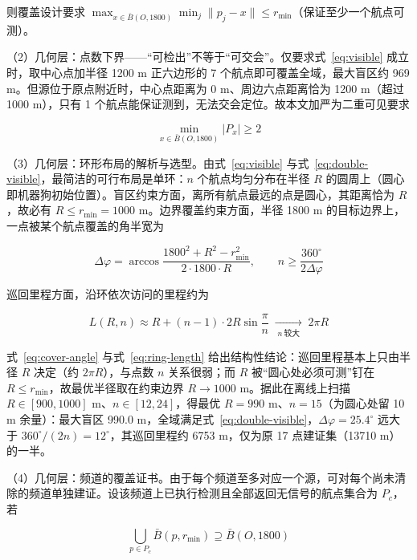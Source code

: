 \documentclass[12pt,a4paper]{ctexart}
\begin{document}
则覆盖设计要求 $\max_{x\in\bar B(O,1800)}\min_j\|p_j-x\|\le r_{\min}$（保证至少一个航点可测）。

（2）几何层：点数下界——“可检出”不等于“可交会”。仅要求式~\eqref{eq:visible} 成立时，取中心点加半径 1200 m 正六边形的 7 个航点即可覆盖全域，最大盲区约 969 m。但源位于原点附近时，中心点距离为 0 m、周边六点距离恰为 1200 m（超过 1000 m），只有 1 个航点能保证测到，无法交会定位。故本文加严为二重可见要求

\begin{equation}
	\min_{x\in\bar B(O,1800)}|P_x|\ge2
	\label{eq:double-visible}
\end{equation}

（3）几何层：环形布局的解析与选型。由式~\eqref{eq:visible} 与式~\eqref{eq:double-visible}，最简洁的可行布局是单环：$n$ 个航点均匀分布在半径 $R$ 的圆周上（圆心即机器狗初始位置）。盲区约束方面，离所有航点最远的点是圆心，其距离恰为 $R$，故必有 $R\le r_{\min}=1000$ m。边界覆盖约束方面，半径 1800 m 的目标边界上，一点被某个航点覆盖的角半宽为

\begin{equation}
	\Delta\varphi=\arccos\dfrac{1800^2+R^2-r_{\min}^2}{2\cdot1800\cdot R},\qquad n\ge\dfrac{360^\circ}{2\Delta\varphi}
	\label{eq:cover-angle}
\end{equation}

巡回里程方面，沿环依次访问的里程约为

\begin{equation}
	L(R,n)\approx R+(n-1)\cdot2R\sin\dfrac{\pi}{n}\;\xrightarrow[\;n\ \text{较大}\;]{}\;2\pi R
	\label{eq:ring-length}
\end{equation}

式~\eqref{eq:cover-angle} 与式~\eqref{eq:ring-length} 给出结构性结论：巡回里程基本上只由半径 $R$ 决定（约 $2\pi R$），与点数 $n$ 关系很弱；而 $R$ 被“圆心处必须可测”钉在 $R\le r_{\min}$，故最优半径取在约束边界 $R\to1000$ m。据此在离线上扫描 $R\in[900,1000]$ m、$n\in[12,24]$，得最优 $R=990$ m、$n=15$（为圆心处留 10 m 余量）：最大盲区 990.0 m，全域满足式~\eqref{eq:double-visible}，$\Delta\varphi=25.4^\circ$ 远大于 $360^\circ/(2n)=12^\circ$，其巡回里程约 6753 m，仅为原 17 点建证集（13710 m）的一半。

（4）几何层：频道的覆盖证书。由于每个频道至多对应一个源，可对每个尚未清除的频道单独建证。设该频道上已执行检测且全部返回无信号的航点集合为 $P_c$，若

\begin{equation}
	\bigcup_{p\in P_c}\bar B(p,r_{\min})\supseteq\bar B(O,1800)
	\label{eq:certset}
\end{equation}
\end{document}
